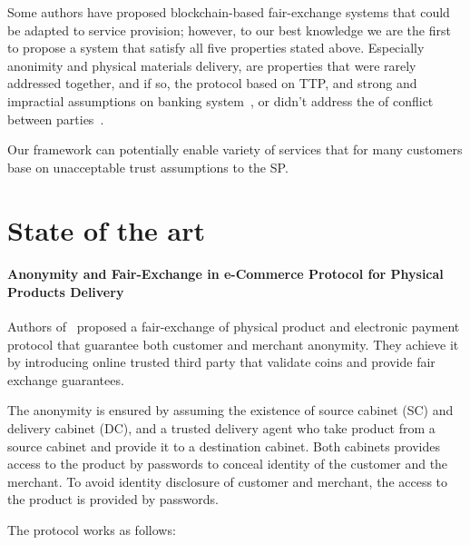 \documentclass{ieeeaccess}
\begin{document}
Some authors have proposed blockchain-based fair-exchange systems that could be adapted to service provision; however, to our best knowledge we
are the first to propose a system that satisfy all five properties
stated above. Especially anonimity and physical materials delivery, are
properties that were rarely addressed together, and if so, the protocol
based on TTP, and strong and impractial assumptions on banking system~\cite{birjoveanu2015anonymity}, or didn't address the of conflict
between parties~\cite{altawy2017lelantos}.

Our framework can potentially enable variety of services that for many
customers base on unacceptable trust assumptions to the SP.


\section{State of the art}\label{state-of-the-art}

\paragraph{Anonymity and Fair-Exchange in e-Commerce Protocol for
Physical Products
Delivery}\label{anonymity-and-fair-exchange-in-e-commerce-protocol-for-physical-products-delivery}

Authors of~\cite{birjoveanu2015anonymity} proposed a
fair-exchange of physical product and electronic payment protocol that
guarantee both customer and merchant anonymity. They achieve it by
introducing online trusted third party that validate coins and provide
fair exchange guarantees.

The anonymity is ensured by assuming the existence of source cabinet
(SC) and delivery cabinet (DC), and a trusted delivery agent who take
product from a source cabinet and provide it to a destination cabinet.
Both cabinets provides access to the product by passwords to conceal
identity of the customer and the merchant. To avoid identity disclosure
of customer and merchant, the access to the product is provided by
passwords.

The protocol works as follows: \begingroup
\renewcommand{\labelenumii}{\arabic{enumii}.}
\end{document}
